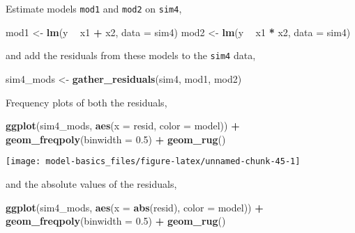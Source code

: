 \documentclass[]{book}
\newenvironment{Shaded}{\begin{snugshade}}{\end{snugshade}}
\newcommand{\DataTypeTok}[1]{\textcolor[rgb]{0.13,0.29,0.53}{#1}}
\newcommand{\FloatTok}[1]{\textcolor[rgb]{0.00,0.00,0.81}{#1}}
\newcommand{\KeywordTok}[1]{\textcolor[rgb]{0.13,0.29,0.53}{\textbf{#1}}}
\newcommand{\NormalTok}[1]{#1}
\newcommand{\OperatorTok}[1]{\textcolor[rgb]{0.81,0.36,0.00}{\textbf{#1}}}
\newcommand{\StringTok}[1]{\textcolor[rgb]{0.31,0.60,0.02}{#1}}
\theoremstyle{definition}
\theoremstyle{definition}
\theoremstyle{definition}
\theoremstyle{remark}
\begin{document}
Estimate models \texttt{mod1} and \texttt{mod2} on \texttt{sim4},

\begin{Shaded}
\begin{Highlighting}[]
\NormalTok{mod1 <-}\StringTok{ }\KeywordTok{lm}\NormalTok{(y }\OperatorTok{~}\StringTok{ }\NormalTok{x1 }\OperatorTok{+}\StringTok{ }\NormalTok{x2, }\DataTypeTok{data =}\NormalTok{ sim4)}
\NormalTok{mod2 <-}\StringTok{ }\KeywordTok{lm}\NormalTok{(y }\OperatorTok{~}\StringTok{ }\NormalTok{x1 }\OperatorTok{*}\StringTok{ }\NormalTok{x2, }\DataTypeTok{data =}\NormalTok{ sim4)}
\end{Highlighting}
\end{Shaded}

and add the residuals from these models to the \texttt{sim4} data,

\begin{Shaded}
\begin{Highlighting}[]
\NormalTok{sim4_mods <-}\StringTok{ }\KeywordTok{gather_residuals}\NormalTok{(sim4, mod1, mod2)}
\end{Highlighting}
\end{Shaded}

Frequency plots of both the residuals,

\begin{Shaded}
\begin{Highlighting}[]

\KeywordTok{ggplot}\NormalTok{(sim4_mods, }\KeywordTok{aes}\NormalTok{(}\DataTypeTok{x =}\NormalTok{ resid, }\DataTypeTok{color =}\NormalTok{ model)) }\OperatorTok{+}
\StringTok{  }\KeywordTok{geom_freqpoly}\NormalTok{(}\DataTypeTok{binwidth =} \FloatTok{0.5}\NormalTok{) }\OperatorTok{+}
\StringTok{  }\KeywordTok{geom_rug}\NormalTok{()}
\end{Highlighting}
\end{Shaded}

\begin{center}\texttt{[image: model-basics\_files/figure-latex/unnamed-chunk-45-1]} \end{center}

and the absolute values of the residuals,

\begin{Shaded}
\begin{Highlighting}[]
\KeywordTok{ggplot}\NormalTok{(sim4_mods, }\KeywordTok{aes}\NormalTok{(}\DataTypeTok{x =} \KeywordTok{abs}\NormalTok{(resid), }\DataTypeTok{color =}\NormalTok{ model)) }\OperatorTok{+}
\StringTok{  }\KeywordTok{geom_freqpoly}\NormalTok{(}\DataTypeTok{binwidth =} \FloatTok{0.5}\NormalTok{) }\OperatorTok{+}
\StringTok{  }\KeywordTok{geom_rug}\NormalTok{()}
\end{Highlighting}
\end{Shaded}
\end{document}
